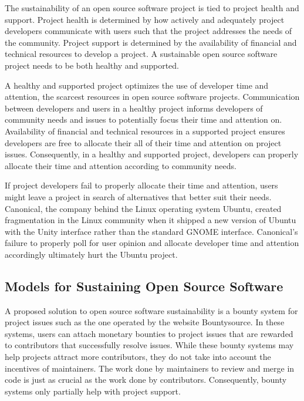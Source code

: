 The sustainability of an open source software project is tied to project health
and support. Project health is determined by how actively and adequately project
developers communicate with users such that the project
addresses the needs of the community. Project support is determined by the
availability of financial and technical resources to develop a project\cite{successOSS}. A sustainable
open source software project needs to be both healthy and supported.

A healthy and supported project optimizes the use of developer time and
attention, the scarcest resources in open source software projects.
Communication between developers and users in a healthy project informs
developers of community needs and issues to potentially focus their time and
attention on. Availability of financial and technical resources in a supported
project ensures developers are free to allocate their all of their time and attention on
project issues. Consequently, in a healthy and supported project, developers can
properly allocate their time and attention according to community needs.

If project developers fail to properly allocate their time and attention, users
might leave a project in search of alternatives that better suit
their needs. Canonical, the company behind the Linux operating system Ubuntu,
created fragmentation in the Linux community when it shipped a new version of
Ubuntu with the Unity interface rather than the standard GNOME
interface\cite{ubuntuUnity}. Canonical's failure to properly poll for user
opinion and allocate developer time and attention accordingly ultimately hurt
the Ubuntu project.

\subsection{Models for Sustaining Open Source Software}

A proposed solution to open source software sustainability is a bounty system
for project issues such as the one operated by the website
Bountysource\cite{bountysource}. In these systems, users can attach monetary
bounties to project issues that are rewarded to contributors that successfully
resolve issues. While these bounty systems may help projects attract more
contributors, they do not take into account the incentives of maintainers. The
work done by maintainers to review and merge in code is just
as crucial as the work done by contributors. Consequently, bounty systems only
partially help with project support.

